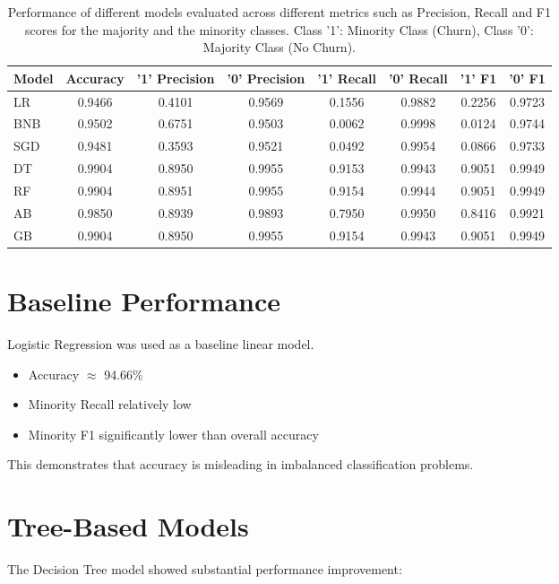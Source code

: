 \documentclass[12pt]{article}
\begin{document}
	\begin{table}[H]
		\centering
		\begin{tabular}{lccccccc}
			\toprule
			Model & Accuracy & '1' Precision & '0' Precision & '1' Recall & '0' Recall & '1' F1 & '0' F1 \\
			\midrule
			LR & 0.9466 & 0.4101 & 0.9569 & 0.1556 & 0.9882 & 0.2256 & 0.9723\\
			BNB & 0.9502 & 0.6751 & 0.9503 & 0.0062 & 0.9998 & 0.0124 & 0.9744\\
			SGD  & 0.9481 & 0.3593 & 0.9521 & 0.0492 & 0.9954 & 0.0866 & 0.9733\\ 
			DT  & 0.9904 & 0.8950 & 0.9955 & 0.9153 & 0.9943 & 0.9051 & 0.9949\\ 
			RF  & 0.9904 & 0.8951 & 0.9955 & 0.9154 & 0.9944 & 0.9051 & 0.9949\\
			AB  & 0.9850 & 0.8939 & 0.9893 & 0.7950 & 0.9950 & 0.8416 & 0.9921\\ 
			GB  & 0.9904 & 0.8950 & 0.9955 & 0.9154 & 0.9943 & 0.9051 & 0.9949\\
			\bottomrule
		\end{tabular}
		\caption{Performance of different models evaluated across different metrics such as Precision, Recall and F1 scores for the majority and the minority classes. Class '1': Minority Class (Churn), Class '0': Majority Class (No Churn).}
	\end{table}
	
	\section{Baseline Performance}
	
	Logistic Regression was used as a baseline linear model.
	
	\begin{itemize}
		\item Accuracy $\approx$ 94.66\%
		\item Minority Recall relatively low
		\item Minority F1 significantly lower than overall accuracy
	\end{itemize}
	
	This demonstrates that accuracy is misleading in imbalanced classification problems.
	
	\section{Tree-Based Models}
	
	The Decision Tree model showed substantial performance improvement:
	
\end{document}
